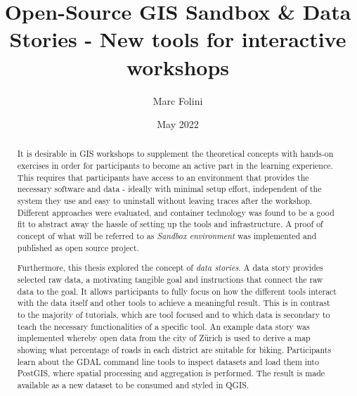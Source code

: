 \documentclass[11pt, a4paper, oneside, parskip=full-]{scrartcl}
\title{Open-Source GIS Sandbox \& Data Stories - New tools for interactive workshops}
\author{Marc Folini}
\date{May 2022}
\begin{document}
\begin{titlepage}
  \setcounter{page}{1}
  \clearpage\maketitle
  \thispagestyle{empty}
  \begin{abstract}
    It is desirable in GIS workshops to supplement the theoretical concepts with
    hands-on exercises in order for participants to become an active part in the
    learning experience. This requires that participants have access to an
    environment that provides the necessary software and data - ideally with
    minimal setup effort, independent of the system they use and easy to
    uninstall without leaving traces after the workshop. Different approaches
    were evaluated, and container technology was found to be a good fit to
    abstract away the hassle of setting up the tools and infrastructure. A proof
    of concept of what will be referred to as \emph{Sandbox environment} was
    implemented and published as open source project.

    Furthermore, this thesis explored the concept of \emph{data stories}. A data
    story provides selected raw data, a motivating tangible goal and
    instructions that connect the raw data to the goal. It allows participants
    to fully focus on how the different tools interact with the data itself and
    other tools to achieve a meaningful result. This is in contrast to the
    majority of tutorials, which are tool focused and to which data is secondary
    to teach the necessary functionalities of a specific tool. An example data
    story was implemented whereby open data from the city of Zürich is used to
    derive a map showing what percentage of roads in each district are suitable
    for biking. Participants learn about the GDAL command line tools to inspect
    datasets and load them into PostGIS, where spatial processing and
    aggregation is performed. The result is made available as a new dataset to
    be consumed and styled in QGIS.
  \end{abstract}
\end{titlepage}

\newpage
\tableofcontents

\newpage
{}
\setcounter{page}{1}
\end{document}
